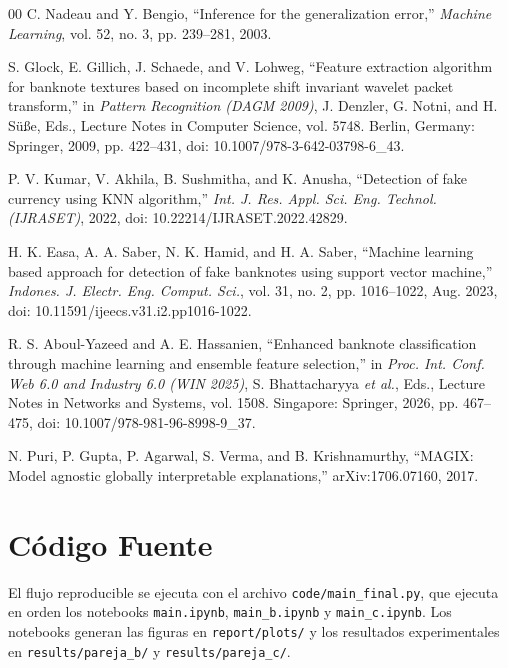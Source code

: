 \documentclass[conference]{IEEEtran}
\begin{document}
\begin{thebibliography}{00}
    	C. Nadeau and Y. Bengio, ``Inference for the generalization error,'' \textit{Machine Learning}, vol. 52, no. 3, pp. 239--281, 2003.

S. Glock, E. Gillich, J. Schaede, and V. Lohweg, ``Feature extraction algorithm for banknote textures based on incomplete shift invariant wavelet packet transform,'' in \textit{Pattern Recognition (DAGM 2009)}, J. Denzler, G. Notni, and H. S\"u{\ss}e, Eds., Lecture Notes in Computer Science, vol. 5748. Berlin, Germany: Springer, 2009, pp. 422--431, doi: 10.1007/978-3-642-03798-6\_43.

P. V. Kumar, V. Akhila, B. Sushmitha, and K. Anusha, ``Detection of fake currency using KNN algorithm,'' \textit{Int. J. Res. Appl. Sci. Eng. Technol. (IJRASET)}, 2022, doi: 10.22214/IJRASET.2022.42829.

H. K. Easa, A. A. Saber, N. K. Hamid, and H. A. Saber, ``Machine learning based approach for detection of fake banknotes using support vector machine,'' \textit{Indones. J. Electr. Eng. Comput. Sci.}, vol. 31, no. 2, pp. 1016--1022, Aug. 2023, doi: 10.11591/ijeecs.v31.i2.pp1016-1022.

R. S. Aboul-Yazeed and A. E. Hassanien, ``Enhanced banknote classification through machine learning and ensemble feature selection,'' in \textit{Proc. Int. Conf. Web 6.0 and Industry 6.0 (WIN 2025)}, S. Bhattacharyya \textit{et al.}, Eds., Lecture Notes in Networks and Systems, vol. 1508. Singapore: Springer, 2026, pp. 467--475, doi: 10.1007/978-981-96-8998-9\_37.

N. Puri, P. Gupta, P. Agarwal, S. Verma, and B. Krishnamurthy, ``MAGIX: Model agnostic globally interpretable explanations,'' arXiv:1706.07160, 2017.

    \end{thebibliography}
	
	\onecolumn
	\appendices
	\section{Código Fuente}
	\label{app:codigo}
	
	El flujo reproducible se ejecuta con el archivo
	\texttt{code/main\_final.py}, que ejecuta en orden los notebooks
	\texttt{main.ipynb}, \texttt{main\_b.ipynb} y \texttt{main\_c.ipynb}.
	Los notebooks generan las figuras en \texttt{report/plots/} y los
	resultados experimentales en \texttt{results/pareja\_b/} y
	\texttt{results/pareja\_c/}. 
	
\end{document}
